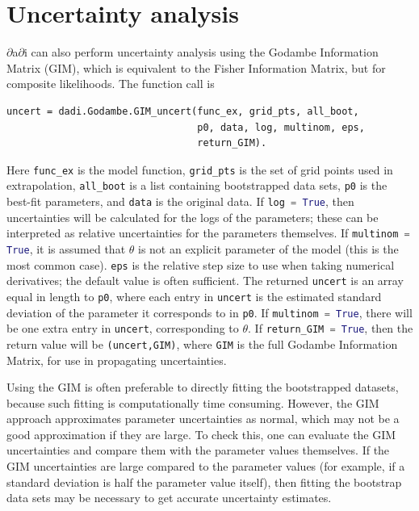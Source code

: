 \documentclass[12pt]{article}
\makeatletter
\newcommand{\dadi}{$\partial$a$\partial$i\xspace}
\newcommand{\py}[1]{\lstinline[language=Python, showstringspaces=False]@#1@}
\makeatother
\begin{document}
\section{Uncertainty analysis}
\dadi can also perform uncertainty analysis using the Godambe Information Matrix (GIM), which is equivalent to the Fisher Information Matrix, but for composite likelihoods.
The function call is
\begin{lstlisting}
uncert = dadi.Godambe.GIM_uncert(func_ex, grid_pts, all_boot,
                                 p0, data, log, multinom, eps,
                                 return_GIM).
\end{lstlisting}
Here \py{func_ex} is the model function, \py{grid_pts} is the set of grid points used in extrapolation, \py{all_boot} is a list containing bootstrapped data sets, \py{p0} is the best-fit parameters, and \py{data} is the original data.
If \py{log = True}, then uncertainties will be calculated for the logs of the parameters; these can be interpreted as relative uncertainties for the parameters themselves.
If \py{multinom = True}, it is assumed that $\theta$ is not an explicit parameter of the model (this is the most common case).
\py{eps} is the relative step size to use when taking numerical derivatives; the default value is often sufficient.
The returned \py{uncert} is an array equal in length to \py{p0}, where each entry in \py{uncert} is the estimated standard deviation of the parameter it corresponds to in \py{p0}.
If \py{multinom = True}, there will be one extra entry in \py{uncert}, corresponding to $\theta$.
If \py{return_GIM = True}, then the return value will be \py{(uncert,GIM)}, where \py{GIM} is the full Godambe Information Matrix, for use in propagating uncertainties.

Using the GIM is often preferable to directly fitting the bootstrapped datasets, because such fitting is computationally time consuming.
However, the GIM approach approximates parameter uncertainties as normal, which may not be a good approximation if they are large.
To check this, one can evaluate the GIM uncertainties and compare them with the parameter values themselves.
If the GIM uncertainties are large compared to the parameter values (for example, if a standard deviation is half the parameter value itself), then fitting the bootstrap data sets may be necessary to get accurate uncertainty estimates.
\end{document}
